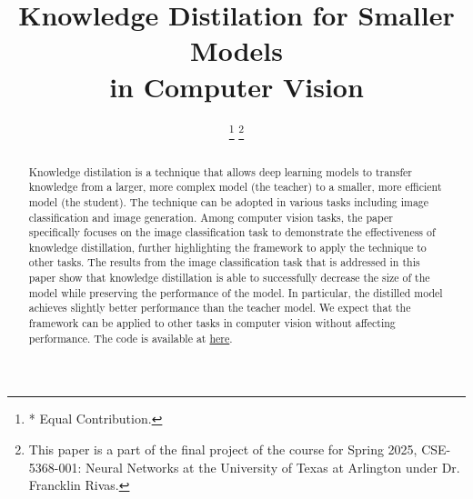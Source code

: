 \documentclass[conference]{IEEEtran}
\begin{document}
\title{
    Knowledge Distilation for Smaller Models\\in Computer Vision
}

\author{
\thanks{* Equal Contribution.}
\thanks{This paper is a part of the final project of the course for Spring 2025, CSE-5368-001: Neural Networks at the University of Texas at Arlington under Dr. Francklin Rivas.}
}

\maketitle

\begin{abstract}
    Knowledge distilation is a technique that allows deep learning models to transfer knowledge from a larger, more complex model (the teacher)
    to a smaller, more efficient model (the student).
    The technique can be adopted in various tasks including image classification and image generation.
    Among computer vision tasks, the paper specifically focuses on the image classification task to demonstrate the effectiveness of knowledge distillation, further highlighting the framework to apply the technique to other tasks.
    The results from the image classification task that is addressed in this paper
show that knowledge distillation is able to successfully decrease the size of the model while preserving the performance of the model.
    In particular, the distilled model achieves slightly better performance than the teacher model.
    We expect that the framework can be applied to other tasks in computer vision without affecting performance.
    The code is available at \href{https://github.com/Abhinaykotla/Knowledge_Distilation_for_Smaller_Models_in_CV_CSE5368}{here}.
\end{abstract}
\end{document}
